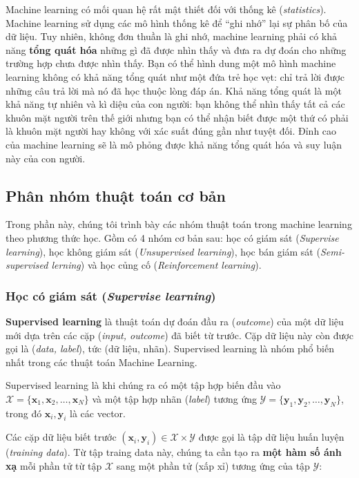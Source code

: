 \documentclass[../main-report.tex]{subfiles}
\begin{document}
Machine learning có mối quan hệ rất mật thiết đối với thống kê (\textit{statistics}). Machine learning sử dụng các mô hình thống kê để ``ghi nhớ'' lại sự phân bố của dữ liệu. Tuy nhiên, không đơn thuần là ghi nhớ, machine learning phải có khả năng \textbf{tổng quát hóa} những gì đã được nhìn thấy và đưa ra dự đoán cho những trường hợp chưa được nhìn thấy. Bạn có thể hình dung một mô hình machine learning không có khả năng tổng quát như một đứa trẻ học vẹt: chỉ trả lời được những câu trả lời mà nó đã học thuộc lòng đáp án. Khả năng tổng quát là một khả năng tự nhiên và kì diệu của con người: bạn không thể nhìn thấy tất cả các khuôn mặt người trên thế giới nhưng bạn có thể nhận biết được một thứ có phải là khuôn mặt người hay không với xác suất đúng gần như tuyệt đối. Đỉnh cao của machine learning sẽ là mô phỏng được khả năng tổng quát hóa và suy luận này của con người.

\subsection{Phân nhóm thuật toán cơ bản}
Trong phần này, chúng tôi trình bày các nhóm thuật toán trong machine learning theo phương thức học. Gồm có 4 nhóm cơ bản sau: học có giám sát (\emph{Supervise learning}), học không giám sát (\emph{Unsupervised learning}), học bán giám sát (\emph{Semi-supervised lerning}) và học củng cố (\emph{Reinforcement learning}).

\subsubsection{Học có giám sát (\emph{Supervise learning})}
\textbf{Supervised learning} là thuật toán dự đoán đầu ra (\emph{outcome}) của một dữ liệu mới dựa trên các cặp (\emph{input, outcome}) đã biết từ trước. Cặp dữ liệu này còn được gọi là (\emph{data, label}), tức (dữ liệu, nhãn). Supervised learning là nhóm phổ biến nhất trong các thuật toán Machine Learning.

Supervised learning là khi chúng ra có một tập hợp biến đầu vào $ \mathcal{X} = \{\mathbf{x}_1, \mathbf{x}_2, \dots, \mathbf{x}_N\} $ và một tập hợp nhãn (\emph{label}) tương ứng \( \mathcal{Y} = \{\mathbf{y}_1, \mathbf{y}_2, \dots,\mathbf{y}_N\} \), trong đó \( \mathbf{x}_i, \mathbf{y}_i \) là các vector. 

Các cặp dữ liệu biết trước \( (\mathbf{x}_i, \mathbf{y}_i) \in \mathcal{X} \times \mathcal{Y} \) 
được gọi là tập dữ liệu huấn luyện (\emph{training data}). Từ tập traing data này, chúng ta cần tạo ra \textbf{một hàm số ánh xạ} mỗi phần tử từ tập \(\mathcal{X}\) sang một phần tử (xấp xỉ) tương ứng của tập \(\mathcal{Y}\):
\end{document}
